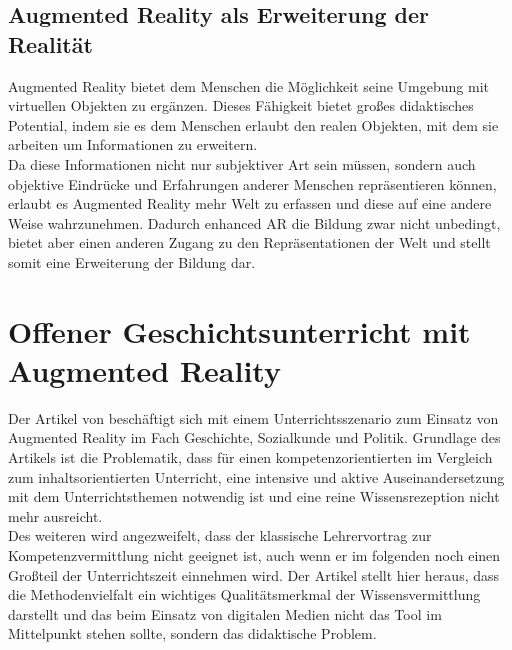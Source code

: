 \subsection{Augmented Reality als Erweiterung der Realität}
Augmented Reality bietet dem Menschen die Möglichkeit seine Umgebung mit virtuellen Objekten zu ergänzen. Dieses Fähigkeit bietet großes didaktisches Potential, indem sie es dem Menschen erlaubt den realen Objekten, mit dem sie arbeiten um Informationen zu erweitern.\\
Da diese Informationen nicht nur subjektiver Art sein müssen, sondern auch objektive Eindrücke und Erfahrungen anderer Menschen repräsentieren können, erlaubt es Augmented Reality mehr Welt zu erfassen und diese auf eine andere Weise wahrzunehmen. Dadurch \glqq enhanced\grqq{} AR die Bildung zwar nicht unbedingt, bietet aber einen anderen Zugang zu den Repräsentationen der Welt und stellt somit eine Erweiterung der Bildung dar. \citep[S. 22-23]{damberger:ar-bildungsenhancement}


\section{Offener Geschichtsunterricht mit Augmented Reality}
Der Artikel \citep{buchner:ar-geschichtsunterricht} von \citeauthor{buchner:ar-geschichtsunterricht} beschäftigt sich mit einem Unterrichtsszenario zum Einsatz von Augmented Reality im Fach Geschichte, Sozialkunde und Politik. 
Grundlage des Artikels ist die Problematik, dass für einen kompetenzorientierten im Vergleich zum inhaltsorientierten Unterricht, eine intensive und aktive Auseinandersetzung mit dem Unterrichtsthemen notwendig ist und eine reine Wissensrezeption nicht mehr ausreicht.\\ 
Des weiteren wird angezweifelt, dass der klassische Lehrervortrag zur Kompetenzvermittlung nicht geeignet ist, auch wenn er im folgenden noch einen Großteil der Unterrichtszeit einnehmen wird. Der Artikel stellt hier heraus, dass die Methodenvielfalt ein wichtiges Qualitätsmerkmal der Wissensvermittlung darstellt und das beim Einsatz von digitalen Medien nicht das Tool im Mittelpunkt stehen sollte, sondern das didaktische Problem.\\

